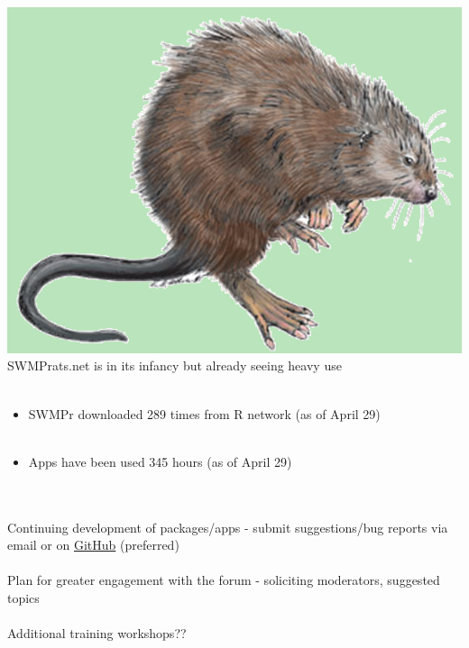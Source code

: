 \documentclass[serif]{beamer}\usepackage[]{graphicx}\usepackage[]{color}
\begin{document}
\begin{frame}[fragile]{\includegraphics[width=0.05\paperwidth]{fig/muskrat.png}\hspace{0.07in}{\bf Continuing work and engagement}}
SWMPrats.net is in its infancy but already seeing heavy use \\~\\
\begin{itemize}
\item SWMPr downloaded 289 times from R network (as of April 29) \\~\\
\item Apps have been used 345 hours (as of April 29)
\end{itemize}\\~\\
Continuing development of packages/apps - submit suggestions/bug reports via email or on \href{https://github.com/fawda123/SWMPr/issues}{GitHub} (preferred) \\~\\
Plan for greater engagement with the forum - soliciting moderators, suggested topics \\~\\
Additional training workshops??
\end{frame}
\end{document}
